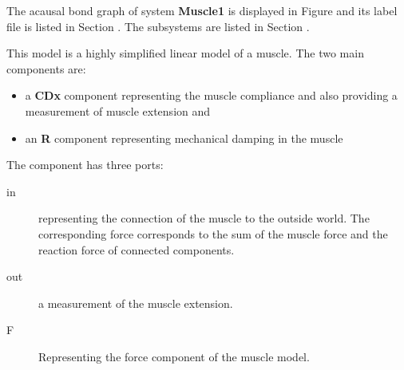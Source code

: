 

   The acausal bond graph of system \textbf{Muscle1} is
   displayed in Figure  and its label
   file is listed in Section .
   The subsystems are listed in Section .


This model is a highly simplified linear model of a muscle. The two
main components are:
\begin{itemize}
\item a \textbf{CDx} component representing the muscle compliance and
  also providing a measurement of muscle extension and
\item an \textbf{R} component representing mechanical damping in the muscle
\end{itemize}

The component has three ports:
\begin{description}
\item [in] representing the connection of the muscle to the outside world. The
  corresponding force corresponds to the sum of the muscle force and
  the reaction force of connected components.
\item[out] a measurement of the muscle extension.
\item[F] Representing the force component of the muscle model.
\end{description} 

